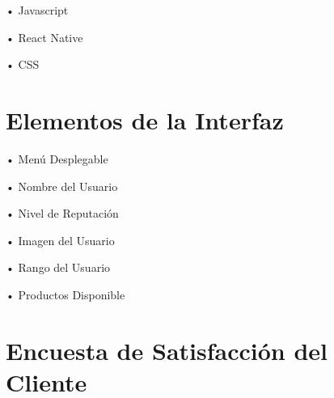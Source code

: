 \documentclass[11pt, a4paper, oneside]{book}
\begin{document}
•	Javascript

•	React Native

•	CSS



\section{Elementos de la Interfaz}

•	Menú Desplegable

•	Nombre del Usuario

•	Nivel de Reputación

•	Imagen del Usuario

•	Rango del Usuario

•	Productos Disponible

\hspace{0cm}

\hspace{2cm}

\hspace{4cm}

\section{Encuesta de Satisfacción del Cliente}
\end{document}

